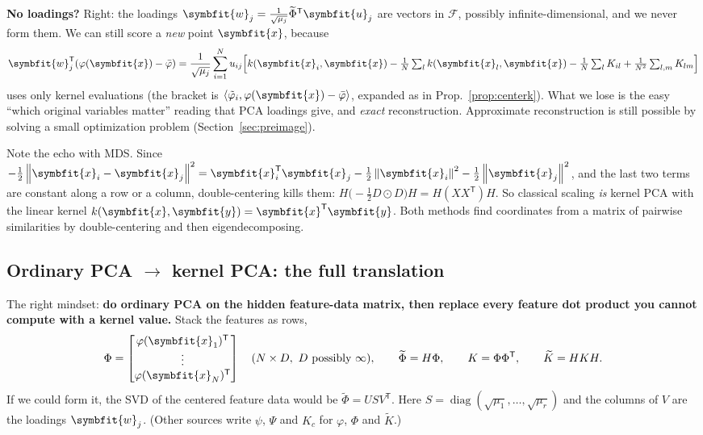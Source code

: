\documentclass[11pt]{article}
\newcommand{\bm}[1]{\symbfit{#1}}
\newcommand{\vx}{\bm{x}}
\newcommand{\vy}{\bm{y}}
\newcommand{\vw}{\bm{w}}
\newcommand{\vu}{\bm{u}}
\newcommand{\T}{^{\mathsf T}}
\newcommand{\diag}{\operatorname{diag}}
\newcommand{\norm}[1]{\left\lVert #1\right\rVert}
\newcommand{\had}{\odot}
\begin{document}
\begin{careful}
\textbf{No loadings?} Right: the loadings $\vw_j=\tfrac1{\sqrt{\mu_j}}\widetilde\Phi\T\vu_j$ are vectors in
$\mathcal F$, possibly infinite-dimensional, and we never form them. We can still score a
\emph{new} point $\vx$, because
\[
\vw_j\T(\varphi(\vx)-\bar{\varphi})=\frac1{\sqrt{\mu_j}}\sum_{i=1}^N u_{ij}\Big[k(\vx_i,\vx)-\tfrac1N\textstyle\sum_lk(\vx_l,\vx)-\tfrac1N\sum_lK_{il}+\tfrac1{N^2}\sum_{l,m}K_{lm}\Big]
\]
uses only kernel evaluations (the bracket is $\langle\tilde\varphi_i,\varphi(\vx)-\bar{\varphi}\rangle$,
expanded as in Prop.~\ref{prop:centerk}). What we lose is the easy ``which original variables matter''
reading that PCA loadings give, and \emph{exact} reconstruction. Approximate reconstruction is still possible by
solving a small optimization problem (Section~\ref{sec:preimage}).
\end{careful}

\begin{deeper}
Note the echo with MDS. Since $-\tfrac12\norm{\vx_i-\vx_j}^2=\vx_i\T\vx_j-\tfrac12\norm{\vx_i}^2-\tfrac12\norm{\vx_j}^2$,
and the last two terms are constant along a row or a column, double-centering kills them:
$H\big(-\tfrac12D\had D\big)H=H(XX\T)H$. So classical scaling \emph{is} kernel PCA with the
linear kernel $k(\vx,\vy)=\vx\T\vy$. Both methods find coordinates from a matrix of
pairwise similarities by double-centering and then eigendecomposing.
\end{deeper}

\subsection{Ordinary PCA $\to$ kernel PCA: the full translation}\label{sec:translate}

The right mindset: \textbf{do ordinary PCA on the hidden feature-data matrix, then replace every feature dot product you
cannot compute with a kernel value.} Stack the features as rows,
\[
\Phi=\begin{bmatrix}\varphi(\vx_1)\T\\\vdots\\\varphi(\vx_N)\T\end{bmatrix}\quad(N\times D,\ D\text{ possibly }\infty),
\qquad \widetilde\Phi=H\Phi,\qquad K=\Phi\Phi\T,\qquad \widetilde K=HKH .
\]
If we could form it, the SVD of the centered feature data would be $\widetilde\Phi=USV\T$. Here
$S=\diag(\sqrt{\mu_1},\dots,\sqrt{\mu_r})$ and the columns of $V$ are the loadings $\vw_j$. (Other sources write $\psi$, $\Psi$ and $K_c$ for
$\varphi$, $\Phi$ and $\widetilde K$.)
\end{document}
